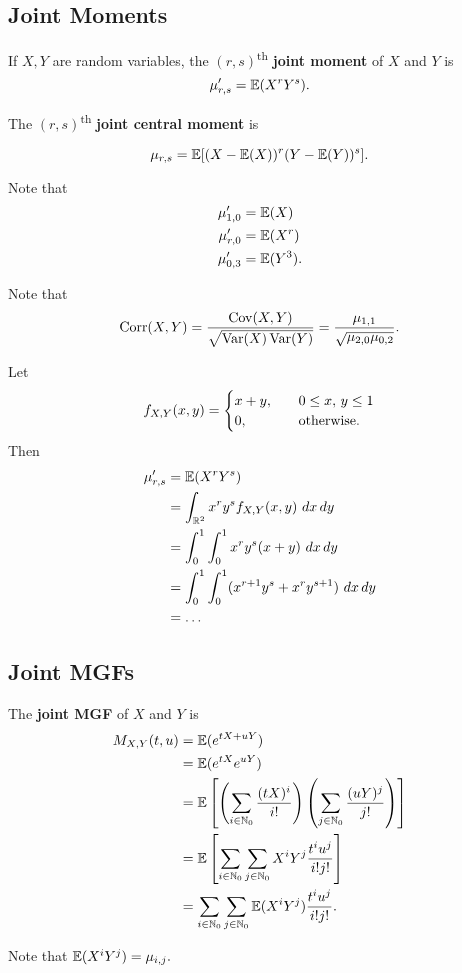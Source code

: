 \subsection{Joint Moments}
\begin{definition}
		If $X,Y$ are random variables, the $(r,s)$\textsuperscript{th} \textbf{joint moment} of $X$ and $Y$ is
$$
\mu'_{r,s}=\mathbb E(X^rY^s).
$$
\end{definition}
\begin{definition}
The $(r,s)$\textsuperscript{th} \textbf{joint central moment} is

$$
\mu_{r,s}=\mathbb E[(X-\mathbb E(X))^r(Y-\mathbb E(Y))^s].
$$
\end{definition}

\begin{eg}
Note that
\begin{align*}
    \mu'_{1,0}&=\mathbb E(X) \\
    \mu'_{r,0}&=\mathbb E(X^r) \\
    \mu'_{0,3}&=\mathbb E(Y^3). 
\end{align*}
\end{eg}

\begin{eg}
Note that
$$\operatorname*{Corr}(X,Y)=\frac{\operatorname*{Cov}(X,Y)}{\sqrt{\operatorname*{Var}(X)\operatorname*{Var}(Y)}}=\frac{\mu_{1,1}}{\sqrt{\mu_{2,0}\mu_{0,2}}}.
$$
\end{eg}

\begin{eg}
Let
$$
f_{X,Y}(x,y)=\begin{cases}
x+y, \quad &0\leq x, \, y\leq 1\\
0, \quad &\text{otherwise.}
\end{cases}
$$
Then
\begin{align*}
    \mu'_{r,s}&=\mathbb E(X^rY^s) \\
    &=\int_{\mathbb R^2} x^r y^s f_{X,Y}(x,y) \ dx \, dy \\
    &= \int^1_0 \int^1_0 x^r y^s (x+y) \ dx \, dy \\
    &= \int^1_0 \int^1_0 (x^{r+1}y^s+x^ry^{s+1}) \ dx \, dy \\
    &=\dots
\end{align*}
\end{eg}
\subsection{Joint MGFs}
\begin{definition}
The \textbf{joint MGF} of $X$ and $Y$ is 
\begin{align*}
    M_{X,Y}(t,u)&=\mathbb E(e^{tX+uY})\\
    &=\mathbb E(e^{tX}e^{uY}) \\
    &=\mathbb E\left[\left(\sum_{i\in\mathbb N_0}\frac{(tX)^i}{i!}\right)\left(\sum_{j\in\mathbb N_0}\frac{(uY)^j}{j!}\right)\right] \\
    &=\mathbb E\left[\sum_{i\in\mathbb N_0}\sum_{j\in \mathbb N_0}X^iY^j\frac{t^iu^j}{i!j!}\right] \\
    &=\sum_{i\in \mathbb N_0}\sum_{j\in \mathbb N_0}\mathbb E(X^iY^j)\frac{t^iu^j}{i!j!}.
\end{align*}
\end{definition}
Note that $\mathbb E(X^iY^j)=\mu_{i,j}.$

